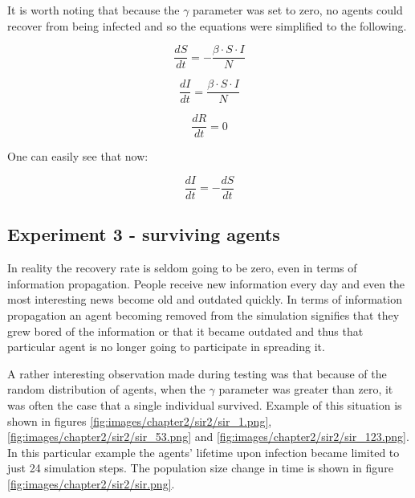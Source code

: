 It is worth noting that because the $\gamma$ parameter was set to zero, no agents could recover from being infected and so the equations were simplified to the following.

\begin{equation} \label{eq:sir1_gamma0}
    \frac{{dS}}{{dt}} = -\frac{{\beta \cdot S \cdot I}}{{N}}
\end{equation}

\begin{equation} \label{eq:sir2_gamma0}
    \frac{{dI}}{{dt}} = \frac{{\beta \cdot S \cdot I}}{{N}}
\end{equation}

\begin{equation} \label{eq:sir3_gamma0}
    \frac{{dR}}{{dt}} = 0
\end{equation}

One can easily see that now:

\begin{equation}
    \frac{{dI}}{{dt}} = -\frac{{dS}}{{dt}}
\end{equation}

\subsection{Experiment 3 - surviving agents}

In reality the recovery rate is seldom going to be zero, even in terms of information propagation.
People receive new information every day and even the most interesting news become old and outdated quickly.
In terms of information propagation an agent becoming removed from the simulation signifies that they grew bored of the information or that it became outdated and thus that particular agent is no longer going to participate in spreading it.


A rather interesting observation made during testing was that because of the random distribution of agents, when the $\gamma$ parameter was greater than zero, it was often the case that a single individual survived.
Example of this situation is shown in figures \ref{fig:images/chapter2/sir2/sir_1.png}, \ref{fig:images/chapter2/sir2/sir_53.png} and \ref{fig:images/chapter2/sir2/sir_123.png}.
In this particular example the agents' lifetime upon infection became limited to just 24 simulation steps.
The population size change in time is shown in figure \ref{fig:images/chapter2/sir2/sir.png}.


